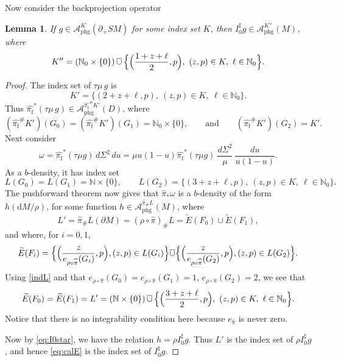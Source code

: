 \documentclass[JEP,XML,SOM,Unicode,NoFloatCountersInSection, NoEqCountersInSection,published]{cedram}
\theoremstyle{plain}
\newtheorem{Lemma}[Theorem]{Lemma}
\theoremstyle{definition}
\theoremstyle{remark}
\def\Nm{{\mathbb{N}}}
\def\A{\mathcal{A}}
\newcommand{\adj}{I_0^\sharp}
\newcommand{\hpi}{\widehat{\pi}}
\newcommand {\dM}{\mathrm{d}M}
\newcommand{\phg}{\mathrm{phg}}
\newcommand{\foot}{{\pi_{\mathrm f}}}
\newcommand{\hF}{\widehat{\foot}}
\begin{document}
Now consider the backprojection operator
\begin{Lemma}\label{lem:I0star} If $g\in \A_{\phg}^K (\partial_+ SM)$ for some index set $K$, then $\adj g \in \A_{\phg}^{K''} (M)$, where\vspace*{-3pt}
\begin{equation}
K'' = (\Nm_0\times \{0\}) \, \overline{\cup} \, \Bigl\{ \Bigl(\frac{1+z+\ell}{2}, p\Bigr),\ (z,p)\in K,\ \ell\in \Nm_0 \Bigr\}.
\label{eq:calE}
\end{equation}
\end{Lemma}

\begin{proof}
The index set of $\tau\mu \, g$ is\vspace*{-3pt}
\begin{equation*}
K' = \{ (2 + z +\ell, p),\ (z,p)\in K,\ \ell\in \Nm_0 \}.
\end{equation*}
Thus $\hF^* (\tau\mu \, g) \in \A_{\phg}^{\hF^\# K'}(D)$, where\vspace*{-3pt}
\begin{equation*}
(\hF^\# K')(G_0) = (\hF^\# K')(G_1) = \Nm_0 \times \{0\}, \qquad\text{and}\qquad (\hF^\# K')(G_2) = K'.
\end{equation*}
Next consider\vspace*{-3pt}
\begin{equation*}
\omega = \hF^* (\tau\mu g)\,d\Sigma^2\,du = \mu u(1-u) \hF^* (\tau\mu g)\ \frac{d\Sigma^2}{\mu}\ \frac{du}{u(1-u)}.
\end{equation*}
As a $b$-density, it has index set
\begin{equation}
L(G_0) = L(G_1) = \Nm \times \{0\}, \qquad L(G_2) = \{ (3 + z+\ell,p),\ (z,p)\in K,\ \ell\in \Nm_0 \}.
\label{indL}
\end{equation}
The pushforward theorem now gives that $\hpi_* \omega$ is a $b$-density of the form $h (\dM/\rho)$, for some function $h\in \A_{\phg}^{\hpi_\# L} (M)$, where
\begin{equation*}
L' = \hpi_\# L (\partial M) = (\rho\circ \hpi)_\# L = \widetilde{E}(F_0) \cup \widetilde {E} (F_1),
\end{equation*}
and where, for $i=0,1$,
\begin{equation*}
\widetilde{E}(F_i) = \Bigl\{ \Bigl(\frac{z}{e_{\rho\circ\hpi}(G_i)}, p \Bigr), (z,p)\in L(G_i) \Bigr\} \overline{\cup} \Bigl\{ \Bigl(\frac{z}{e_{\rho\circ\hpi}(G_2)}, p \Bigr), (z,p)\in L(G_2) \Bigr\}.
\end{equation*}
Using \eqref{indL} and that $e_{\rho\circ\hpi}(G_0) = e_{\rho\circ\hpi}(G_1) = 1$, $e_{\rho \circ \hpi}(G_2) = 2$, we see that
\begin{equation*}
\widetilde{E}(F_0) = \widetilde{E}(F_1) = L' = (\Nm\times \{0\}) \, \overline{\cup} \, \Bigl\{ \Bigl(\frac{3+z +\ell}{2}, p \Bigr),\ (z,p)\in K,\ \ell\in\Nm_0 \Bigr\}.
\end{equation*}
Notice that there is no integrability condition here because $e_{\hpi}$ is never zero.

Now by \eqref{eq:I0star}, we have the relation $h = \rho \adj g$. Thus $L'$ is the index set of $\rho \adj g$, and hence \eqref{eq:calE} is the index set of $\adj g$.
\end{proof}
\end{document}
